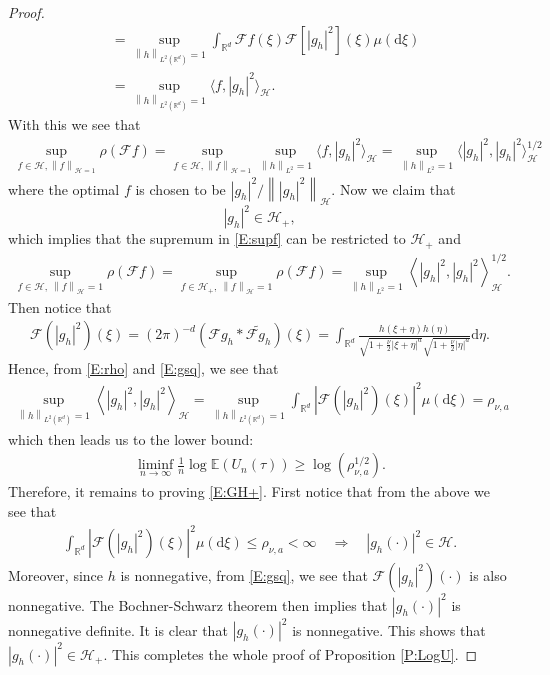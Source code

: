 \documentclass[12pt]{report}
\theoremstyle{plain}
\theoremstyle{definition}
\numberwithin{equation}{section}
\newcommand{\R}{\mathbb{R}}
\newcommand{\Norm}[1]{\left\|  #1   \right\|}
\newcommand{\ud}{\ensuremath{ \mathrm{d} }}
\begin{document}
\begin{proof}
\begin{align*}
	& = \sup_{\Norm{h}_{L^2(\R^d)}=1} \int_{\R^d}\mathcal{F}f(\xi)\mathcal{F}[|g_h|^2](\xi) \mu(\ud \xi)                                   \\
	& = \sup_{\Norm{h}_{L^2(\R^d)}=1}\langle f, |g_h|^2 \rangle _{\mathcal{H}}.
	\end{align*}
	With this we see that
	\begin{align}
	\label{E:supf}
	\sup_{ f\in \mathcal{H}, \Norm{f}_{\mathcal{H}=1} } \rho(\mathcal{F}f) = 	\sup_{ f\in \mathcal{H}, \Norm{f}_{\mathcal{H}=1} }\sup_{\Norm{h}_{L^2}=1} \langle f, |g_h|^2 \rangle _{\mathcal{H}} = \sup_{\Norm{h}_{L^2}=1} \langle |g_h|^2, |g_h|^2 \rangle^{1/2} _{\mathcal{H}}
	\end{align}
	where the optimal $f$ is chosen to be $|g_h|^2/\Norm{|g_h|^2}_{\mathcal{H}}$. Now we claim that
	\begin{equation}
	\label{E:GH+}
	|g_h|^2 \in \mathcal{H}_+,
	\end{equation}
	which implies that the supremum in \eqref{E:supf} can be restricted to $\mathcal{H}_+$ and
	\begin{align*}
	\sup_{ f \in \mathcal{H},\: \Norm{f}_{\mathcal{H}}=1 } \rho(\mathcal{F}f) =
	\sup_{ f \in \mathcal{H}_+,\: \Norm{f}_{\mathcal{H}}=1 } \rho(\mathcal{F}f) =
	\sup_{\Norm{h}_{L^2}=1} \left\langle |g_h|^2, |g_h|^2 \right\rangle^{1/2} _{\mathcal{H}}.
	\end{align*}
	Then notice that
	\begin{align}
	\label{E:gsq}
	\mathcal{F}( |g_h|^2 )(\xi) = (2\pi)^{-d} (\mathcal{F}g_h*\widetilde{\mathcal{F}g_h})(\xi)
	= \int_{\R^d} \frac{h(\xi + \eta)h(\eta)}{\sqrt{1+\frac{\nu}{2}|\xi+\eta|^a}\sqrt{1+\frac{\nu}{2}|\eta|^a}} \ud \eta.
	\end{align}
	Hence, from \eqref{E:rho} and \eqref{E:gsq}, we see that
	\begin{align*}
	\sup_{ \Norm{h}_{L^2(\R^d)}=1 }\left\langle |g_h|^2, |g_h|^2 \right\rangle_{\mathcal{H}}
	=\sup_{ \Norm{h}_{L^2(\R^d)}=1 } \int_{\R^d} \left|\mathcal{F}( |g_h|^2 )(\xi)\right|^2 \mu(\ud \xi)
	= \rho_{\nu,a}
	\end{align*}
	which then leads us to the lower bound:
	\begin{align*}
	\liminf_{n\to \infty} \frac{1}{n} \log \mathbb{E} (U_n(\tau) ) \ge \log\left(\rho_{\nu,a}^{1/2}\right).
	\end{align*}
	Therefore, it remains to proving \eqref{E:GH+}. First notice that from the above we see that
	\begin{align*}
	\int_{\R^d} \left| \mathcal{F}\left(|g_h|^2\right)(\xi) \right|^2 \mu(\ud \xi) \le \rho_{\nu,a} < \infty
	\quad \Longrightarrow \quad |g_h(\cdot)|^2 \in \mathcal{H}.
	\end{align*}
	Moreover, since $h$ is nonnegative, from \eqref{E:gsq}, we see that
	$\mathcal{F}\left(|g_h|^2\right)(\cdot)$ is also nonnegative. The Bochner-Schwarz theorem then
	implies that $|g_h(\cdot)|^2$ is nonnegative definite. It is clear that $|g_h(\cdot)|^2$ is
	nonnegative. This shows that $|g_h(\cdot)|^2 \in \mathcal{H}_+$.  This completes the whole proof
	of Proposition \ref{P:LogU}.
\end{proof}
\end{document}
